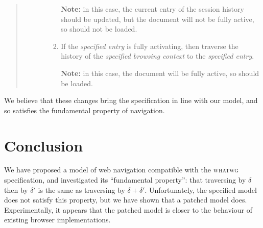 \documentclass{notes}
\begin{document}
\begin{quote}
\begin{enumerate}
\begin{enumerate}
\begin{enumerate}
        \textbf{Note:} in this case, the current entry of the session history should
        be updated, but the document will not be fully active, so should not be loaded.

      \item If the \emph{specified entry} is fully activating, then
        traverse the history of the \emph{specified browsing context}
        to the \emph{specified entry}.

        \textbf{Note:} in this case, the document will be fully active, so should be loaded.

      \end{enumerate}

    \end{enumerate}

  \end{enumerate}
\end{quote}
We believe that these changes bring the specification in line with our model, and
so satisfies the fundamental property of navigation.

\section{Conclusion}

We have proposed a model of web navigation compatible with the
\textsc{whatwg} specification, and investigated its ``fundamental
property'': that traversing by $\delta$ then by $\delta'$ is the same
as traversing by $\delta+\delta'$.  Unfortunately, the specified model
does not satisfy this property, but we have shown that a patched model
does. Experimentally, it appears that the patched model is closer to
the behaviour of existing browser implementations.



\end{document}
